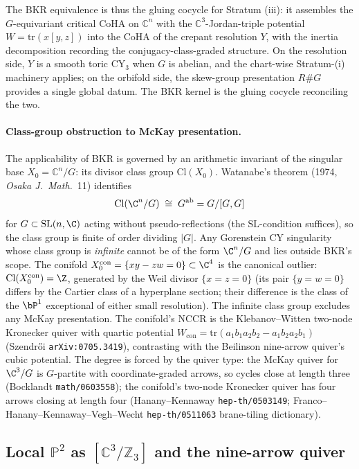 The BKR equivalence is thus the gluing cocycle for Stratum (iii): it assembles the $G$-equivariant critical CoHA on $\mathbb{C}^n$ with the $\mathbb{C}^3$-Jordan-triple potential $W = \mathrm{tr}(x[y,z])$ into the CoHA of the crepant resolution $Y$, with the inertia decomposition recording the conjugacy-class-graded structure. On the resolution side, $Y$ is a smooth toric CY$_3$ when $G$ is abelian, and the chart-wise Stratum-(i) machinery applies; on the orbifold side, the skew-group presentation $R \# G$ provides a single global datum. The BKR kernel is the gluing cocycle reconciling the two.

\paragraph{Class-group obstruction to McKay presentation.}
The applicability of BKR is governed by an arithmetic invariant of the singular base $X_0 = \mathbb{C}^n/G$: its divisor class group $\mathrm{Cl}(X_0)$. Watanabe's theorem (1974, \emph{Osaka J.\ Math.}\ 11) identifies
\[
\mathrm{Cl}(\C^n/G) \;\cong\; G^{\mathrm{ab}} = G/[G, G]
\]
for $G \subset \mathrm{SL}(n, \C)$ acting without pseudo-reflections (the $\mathrm{SL}$-condition suffices), so the class group is finite of order dividing $|G|$. Any Gorenstein CY singularity whose class group is \emph{infinite} cannot be of the form $\C^n/G$ and lies outside BKR's scope. The conifold $X_0^{\mathrm{con}} = \{xy - zw = 0\} \subset \C^4$ is the canonical outlier: $\mathrm{Cl}(X_0^{\mathrm{con}}) = \Z$, generated by the Weil divisor $\{x = z = 0\}$ (its pair $\{y = w = 0\}$ differs by the Cartier class of a hyperplane section; their difference is the class of the $\bP^1$ exceptional of either small resolution). The infinite class group excludes any McKay presentation. The conifold's NCCR is the Klebanov--Witten two-node Kronecker quiver with quartic potential $W_{\mathrm{con}} = \mathrm{tr}(a_1 b_1 a_2 b_2 - a_1 b_2 a_2 b_1)$ (Szendr\H{o}i \texttt{arXiv:0705.3419}), contrasting with the Beilinson nine-arrow quiver's cubic potential. The degree is forced by the quiver type: the McKay quiver for $\C^3/G$ is $G$-partite with coordinate-graded arrows, so cycles close at length three (Bocklandt \texttt{math/0603558}); the conifold's two-node Kronecker quiver has four arrows closing at length four (Hanany--Kennaway \texttt{hep-th/0503149}; Franco--Hanany--Kennaway--Vegh--Wecht \texttt{hep-th/0511063} brane-tiling dictionary).

\subsection{Local \texorpdfstring{$\mathbb{P}^2$}{P2} as \texorpdfstring{$[\mathbb{C}^3/\mathbb{Z}_3]$}{[C3/Z3]} and the nine-arrow quiver}
\label{sec:local-P2-orbifold}

